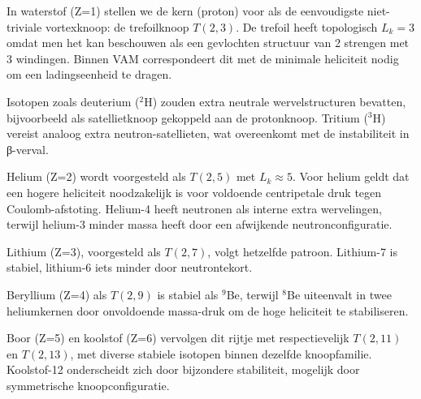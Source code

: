 In waterstof (Z=1) stellen we de kern (proton) voor als de eenvoudigste niet-triviale vortexknoop: de trefoilknoop $T(2,3)$. De trefoil heeft topologisch $L_k=3$ omdat men het kan beschouwen als een gevlochten structuur van 2 strengen met 3 windingen. Binnen VAM correspondeert dit met de minimale heliciteit nodig om een ladingseenheid te dragen.

Isotopen zoals deuterium ($^2$H) zouden extra neutrale wervelstructuren bevatten, bijvoorbeeld als satellietknoop gekoppeld aan de protonknoop. Tritium ($^3$H) vereist analoog extra neutron-satellieten, wat overeenkomt met de instabiliteit in β-verval.

Helium (Z=2) wordt voorgesteld als $T(2,5)$ met $L_k \approx 5$. Voor helium geldt dat een hogere heliciteit noodzakelijk is voor voldoende centripetale druk tegen Coulomb-afstoting. Helium-4 heeft neutronen als interne extra wervelingen, terwijl helium-3 minder massa heeft door een afwijkende neutronconfiguratie.

Lithium (Z=3), voorgesteld als $T(2,7)$, volgt hetzelfde patroon. Lithium-7 is stabiel, lithium-6 iets minder door neutrontekort.

Beryllium (Z=4) als $T(2,9)$ is stabiel als $^9$Be, terwijl $^8$Be uiteenvalt in twee heliumkernen door onvoldoende massa-druk om de hoge heliciteit te stabiliseren.

Boor (Z=5) en koolstof (Z=6) vervolgen dit rijtje met respectievelijk $T(2,11)$ en $T(2,13)$, met diverse stabiele isotopen binnen dezelfde knoopfamilie. Koolstof-12 onderscheidt zich door bijzondere stabiliteit, mogelijk door symmetrische knoopconfiguratie.

\usepackage{tabularx} %

